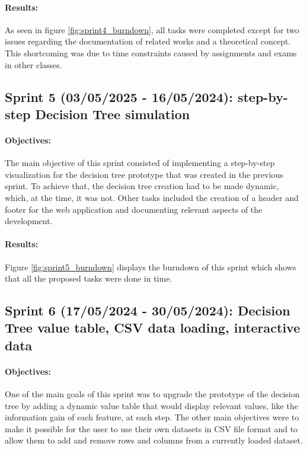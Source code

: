 \paragraph{Results:}
As seen in figure \ref{fig:sprint4_burndown}, all tasks were completed except for two issues regarding the documentation of related works and a theoretical concept. This shortcoming was due to time constraints caused by assignments and exams in other classes.

\subsection{Sprint 5 (03/05/2025 - 16/05/2024): step-by-step Decision Tree simulation}
\paragraph{Objectives:}
The main objective of this sprint consisted of implementing a step-by-step visualization for the decision tree prototype that was created in the previous sprint. To achieve that, the decision tree creation had to be made dynamic, which, at the time, it was not. Other tasks included the creation of a header and footer for the web application and documenting relevant aspects of the development.

\paragraph{Results:}
Figure \ref{fig:sprint5_burndown} displays the burndown of this sprint which shows that all the proposed tasks were done in time.

\subsection{Sprint 6 (17/05/2024 - 30/05/2024): Decision Tree value table, CSV data loading, interactive data}
\paragraph{Objectives:}
One of the main goals of this sprint was to upgrade the prototype of the decision tree by adding a dynamic value table that would display relevant values, like the information gain of each feature, at each step. The other main objectives were to make it possible for the user to use their own datasets in CSV file format and to allow them to add and remove rows and columns from a currently loaded dataset.

